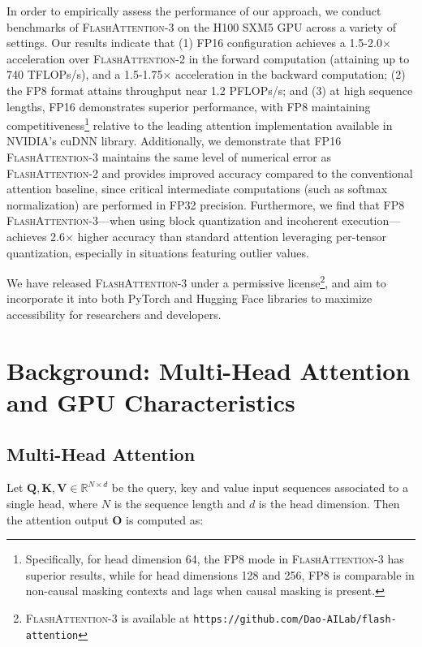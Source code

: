 In order to empirically assess the performance of our approach, we conduct benchmarks of \textsc{FlashAttention-3} on the H100 SXM5 GPU across a variety of settings. Our results indicate that (1) FP16 configuration achieves a 1.5-2.0$\times$ acceleration over \textsc{FlashAttention-2} in the forward computation (attaining up to 740 TFLOPs/s), and a 1.5-1.75$\times$ acceleration in the backward computation; (2) the FP8 format attains throughput near 1.2 PFLOPs/s; and (3) at high sequence lengths, FP16 demonstrates superior performance, with FP8 maintaining competitiveness\footnote{Specifically, for head dimension 64, the FP8 mode in \textsc{FlashAttention-3} has superior results, while for head dimensions 128 and 256, FP8 is comparable in non-causal masking contexts and lags when causal masking is present.} relative to the leading attention implementation available in NVIDIA’s cuDNN library. Additionally, we demonstrate that FP16 \textsc{FlashAttention-3} maintains the same level of numerical error as \textsc{FlashAttention-2} and provides improved accuracy compared to the conventional attention baseline, since critical intermediate computations (such as softmax normalization) are performed in FP32 precision. Furthermore, we find that FP8 \textsc{FlashAttention-3}—when using block quantization and incoherent execution—achieves 2.6$\times$ higher accuracy than standard attention leveraging per-tensor quantization, especially in situations featuring outlier values.

We have released \textsc{FlashAttention-3} under a permissive license\footnote{\textsc{FlashAttention-3} is available at \texttt{https://github.com/Dao-AILab/flash-attention}}, and aim to incorporate it into both PyTorch and Hugging Face libraries to maximize accessibility for researchers and developers.

\section{Background: Multi-Head Attention and GPU Characteristics}
\label{sec:background}

\subsection{Multi-Head Attention}
\label{subsec:multi_head_attn}

Let $\mathbf{Q}, \mathbf{K}, \mathbf{V} \in \mathbb{R}^{N \times d}$ be the query, key and value input sequences associated to a single head, where $N$ is the sequence length and $d$ is the head dimension. Then the attention output $\mathbf{O}$ is computed as:

